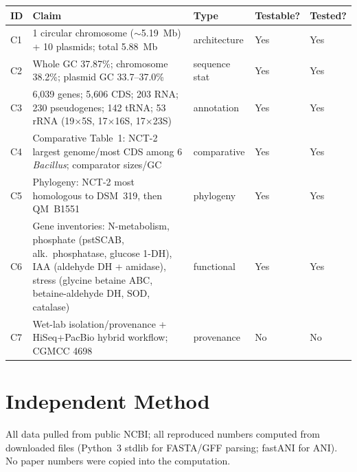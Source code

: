\documentclass[11pt]{article}
\begin{document}
\begin{longtable}{@{}p{0.6cm}p{9cm}p{2.2cm}p{1.4cm}p{1.4cm}@{}}
\toprule
ID & Claim & Type & Testable? & Tested? \\
\midrule
\endhead
C1 & 1 circular chromosome ($\sim$5.19~Mb) + 10 plasmids; total 5.88~Mb & architecture & Yes & Yes \\
C2 & Whole GC 37.87\%; chromosome 38.2\%; plasmid GC 33.7--37.0\% & sequence stat & Yes & Yes \\
C3 & 6{,}039 genes; 5{,}606 CDS; 203 RNA; 230 pseudogenes; 142 tRNA; 53 rRNA (19$\times$5S, 17$\times$16S, 17$\times$23S) & annotation & Yes & Yes \\
C4 & Comparative Table~1: NCT-2 largest genome/most CDS among 6 \emph{Bacillus}; comparator sizes/GC & comparative & Yes & Yes \\
C5 & Phylogeny: NCT-2 most homologous to DSM~319, then QM~B1551 & phylogeny & Yes & Yes \\
C6 & Gene inventories: N-metabolism, phosphate (pstSCAB, alk.~phosphatase, glucose 1-DH), IAA (aldehyde DH + amidase), stress (glycine betaine ABC, betaine-aldehyde DH, SOD, catalase) & functional & Yes & Yes \\
C7 & Wet-lab isolation/provenance + HiSeq+PacBio hybrid workflow; CGMCC 4698 & provenance & No & No \\
\bottomrule
\end{longtable}

\section{Independent Method}

All data pulled from public NCBI; all reproduced numbers computed from downloaded files (Python~3 stdlib for FASTA/GFF parsing; fastANI for ANI). No paper numbers were copied into the computation.
\end{document}

